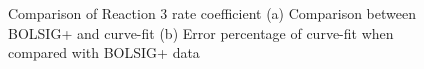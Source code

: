 \documentclass{warpdoc}
\begin{document}
\begin{figure}[H]
\centering     %
{}
\caption{Comparison of Reaction 3 rate coefficient (a) Comparison between BOLSIG+ and curve-fit (b) Error percentage of curve-fit when compared with BOLSIG+ data}
\label{fig:Reaction_3_comparison}
\end{figure}
%
%
\end{document}
